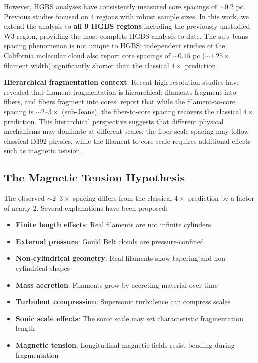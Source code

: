 \documentclass[11pt,a4paper]{article}
\begin{document}
However, HGBS analyses have consistently measured core spacings of $\sim0.2$ pc. Previous studies focused on 4 regions with robust sample sizes. In this work, we extend the analysis to \textbf{all 9 HGBS regions} including the previously unstudied W3 region, providing the most complete HGBS analysis to date. The sub-Jeans spacing phenomenon is not unique to HGBS; independent studies of the California molecular cloud also report core spacings of $\sim0.15$ pc ($\sim1.25\times$ filament width) significantly shorter than the classical $4\times$ prediction \citep{Zhang2024}.

\textbf{Hierarchical fragmentation context}: Recent high-resolution studies \citep{Yang2024} have revealed that filament fragmentation is hierarchical: filaments fragment into fibers, and fibers fragment into cores. \citet{Yang2024} report that while the filament-to-core spacing is $\sim$2--$3\times$ (sub-Jeans), the fiber-to-core spacing recovers the classical $4\times$ prediction. This hierarchical perspective suggests that different physical mechanisms may dominate at different scales: the fiber-scale spacing may follow classical IM92 physics, while the filament-to-core scale requires additional effects such as magnetic tension.

\subsection{The Magnetic Tension Hypothesis}

The observed $\sim2$--$3\times$ spacing differs from the classical $4\times$ prediction by a factor of nearly 2. Several explanations have been proposed:

\begin{itemize}
    \item \textbf{Finite length effects}: Real filaments are not infinite cylinders \citep{Inutsuka1997}
    \item \textbf{External pressure}: Gould Belt clouds are pressure-confined \citep{Fischera2012}
    \item \textbf{Non-cylindrical geometry}: Real filaments show tapering and non-cylindrical shapes
    \item \textbf{Mass accretion}: Filaments grow by accreting material over time \citep{Heitsch2013, Chen2024}
    \item \textbf{Turbulent compression}: Supersonic turbulence can compress scales \citep{Padoan2011}
    \item \textbf{Sonic scale effects}: The sonic scale may set characteristic fragmentation length \citep{Federrath2016}
    \item \textbf{Magnetic tension}: Longitudinal magnetic fields resist bending during fragmentation
\end{itemize}
\end{document}
